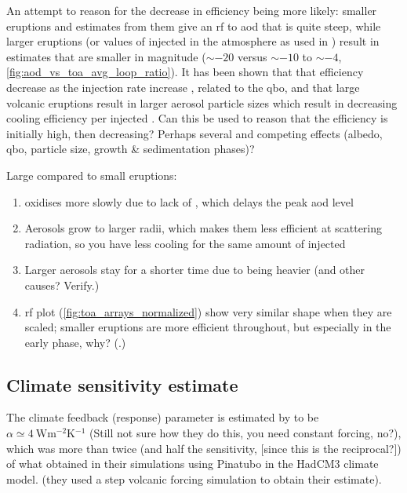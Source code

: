 \documentclass{ametsocV5}
\newcommand{\iso}[1][i]{{#1}njected \ce{SO2}}
\begin{document}
An attempt to reason for the decrease in efficiency being more likely: smaller eruptions
and estimates from them give an \ac{rf} to \ac{aod} that is quite steep, while larger
eruptions (or values of \iso{} in the atmosphere as used in \citet{niemeier2015}) result
in estimates that are smaller in magnitude (\(\sim-20\) versus \(\sim-10\) to
\(\sim-4\), \cref{fig:aod_vs_toa_avg_loop_ratio}). It has been shown that that
efficiency decrease as the injection rate increase \citep{niemeier2017}, related to the
\ac{qbo}, and that large volcanic eruptions result in larger aerosol particle sizes
which result in decreasing cooling efficiency per \iso{} \citep{english2013,
  timmreck2018}. Can this be used to reason that the efficiency is initially high, then
decreasing? Perhaps several and competing effects (albedo, \ac{qbo}, particle size,
growth \& sedimentation phases)?

Large compared to small eruptions:

\begin{enumerate}
  \item {} oxidises more slowly due to lack of , which delays the peak \ac{aod}
        level
  \item Aerosols grow to larger radii, which makes them less efficient at scattering radiation,
        so you have less cooling for the same amount of \iso{}
  \item Larger aerosols stay for a shorter time due to being heavier (and other causes? Verify.)
  \item \ac{rf} plot (\cref{fig:toa_arrays_normalized}) show very similar shape when they are
        scaled; smaller eruptions are more efficient throughout, but especially in the early
        phase, why? (.)
\end{enumerate}

\subsection{Climate sensitivity estimate}%
\label{sec:climate-sensitivity-estimate}

The climate feedback (response) parameter is estimated by \citet{jones2005} to be
\(\alpha \simeq \SI{4}{\watt\metre^{-2}\kelvin^{-1}}\) (Still not sure how they do this,
you need constant forcing, no?), which was more than twice (and half the sensitivity,
[since this is the reciprocal?]) of what \citet{gregory2016} obtained in their
simulations using Pinatubo in the HadCM3 climate model. (they used a step volcanic
forcing simulation to obtain their estimate).
\end{document}
